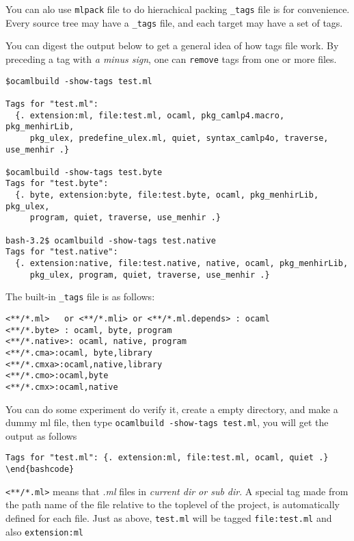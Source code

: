 \documentclass[11pt]{article}
\begin{document}
   You can alo use \texttt{mlpack} file to do hierachical packing \texttt{\_tags}
   file is for convenience.  Every source tree may have a \texttt{\_tags}
   file, and each target may have a set of tags.



   You can digest the output below to get a general idea of how tags
   file work.  By preceding a tag with \emph{a minus sign}, one can
   \texttt{remove} tags from one or more files.


\begin{verbatim}
$ocamlbuild -show-tags test.ml

Tags for "test.ml":
  {. extension:ml, file:test.ml, ocaml, pkg_camlp4.macro, pkg_menhirLib,
     pkg_ulex, predefine_ulex.ml, quiet, syntax_camlp4o, traverse, use_menhir .}

$ocamlbuild -show-tags test.byte
Tags for "test.byte":
  {. byte, extension:byte, file:test.byte, ocaml, pkg_menhirLib, pkg_ulex,
     program, quiet, traverse, use_menhir .}

bash-3.2$ ocamlbuild -show-tags test.native
Tags for "test.native":
  {. extension:native, file:test.native, native, ocaml, pkg_menhirLib,
     pkg_ulex, program, quiet, traverse, use_menhir .}
\end{verbatim}
   
   The built-in \texttt{\_tags} file is as follows:


\begin{verbatim}
<**/*.ml>   or <**/*.mli> or <**/*.ml.depends> : ocaml 
<**/*.byte> : ocaml, byte, program 
<**/*.native>: ocaml, native, program
<**/*.cma>:ocaml, byte,library
<**/*.cmxa>:ocaml,native,library
<**/*.cmo>:ocaml,byte
<**/*.cmx>:ocaml,native
\end{verbatim}

   You can do some experiment do verify it, create a empty directory, and
   make a dummy ml file, then type \texttt{ocamlbuild -show-tags test.ml},
   you will get the output as follows 


\begin{verbatim}
Tags for "test.ml": {. extension:ml, file:test.ml, ocaml, quiet .}
\end{bashcode}
\end{verbatim}

   \texttt{<**/*.ml>} means that \emph{.ml} files in \emph{current dir or sub dir}. A
  special tag made from the path name of the file relative to the
  toplevel of the project, is automatically defined for each file.
  Just as above, \texttt{test.ml} will be tagged \texttt{file:test.ml} and also
  \texttt{extension:ml}
\end{document}
